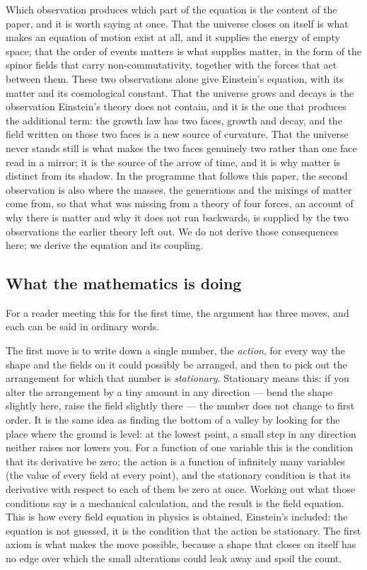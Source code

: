 \documentclass[11pt,a4paper]{article}
\theoremstyle{plain}
\theoremstyle{definition}
\theoremstyle{remark}
\begin{document}
Which observation produces which part of the equation is the content of the paper, and it is worth saying at once. That the universe closes on itself is what makes an equation of motion exist at all, and it supplies the energy of empty space; that the order of events matters is what supplies matter, in the form of the spinor fields that carry non-commutativity, together with the forces that act between them. These two observations alone give Einstein's equation, with its matter and its cosmological constant. That the universe grows and decays is the observation Einstein's theory does not contain, and it is the one that produces the additional term: the growth law has two faces, growth and decay, and the field written on those two faces is a new source of curvature. That the universe never stands still is what makes the two faces genuinely two rather than one face read in a mirror; it is the source of the arrow of time, and it is why matter is distinct from its shadow. In the programme that follows this paper, the second observation is also where the masses, the generations and the mixings of matter come from, so that what was missing from a theory of four forces, an account of why there is matter and why it does not run backwards, is supplied by the two observations the earlier theory left out. We do not derive those consequences here; we derive the equation and its coupling.

\subsection{What the mathematics is doing}\label{sec:what-maths}

For a reader meeting this for the first time, the argument has three moves, and each can be said in ordinary words.

The first move is to write down a single number, the \emph{action}, for
every way the shape and the fields on it could possibly be arranged, and
then to pick out the arrangement for which that number is \emph{stationary}.
Stationary means this: if you alter the arrangement by a tiny amount in any
direction --- bend the shape slightly here, raise the field slightly there
--- the number does not change to first order. It is the same idea as finding
the bottom of a valley by looking for the place where the ground is level:
at the lowest point, a small step in any direction neither raises nor
lowers you. For a function of one variable this is the condition that its
derivative be zero; the action is a function of infinitely many variables
(the value of every field at every point), and the stationary condition is
that its derivative with respect to each of them be zero at once. Working
out what those conditions say is a mechanical calculation, and the result
is the field equation. This is how every field equation in physics is
obtained, Einstein's included: the equation is not guessed, it is the
condition that the action be stationary. The first axiom is what makes the
move possible, because a shape that closes on itself has no edge over which
the small alterations could leak away and spoil the count.
\end{document}
